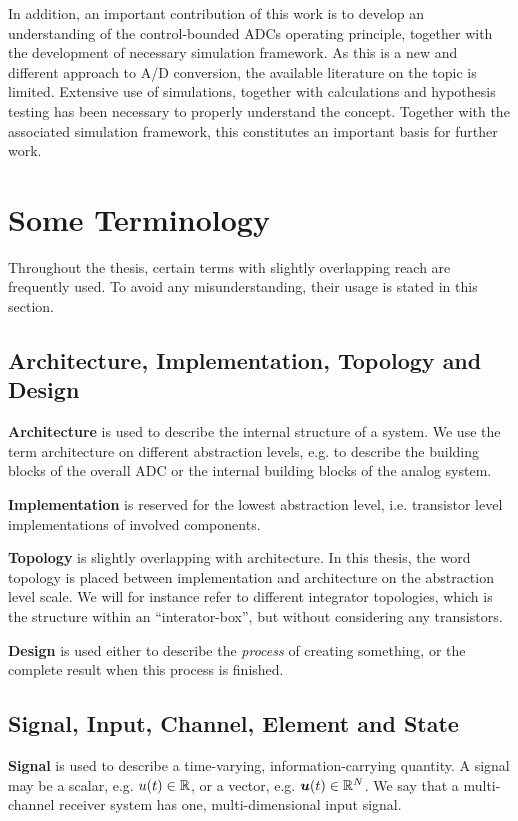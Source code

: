 In addition, an important contribution of this work is to develop an understanding of the control-bounded ADCs operating principle, together with the development of necessary simulation framework. As this is a new and different approach to A/D conversion, the available literature on the topic is limited. Extensive use of simulations, together with calculations and hypothesis testing has been necessary to properly understand the concept. Together with the associated simulation framework, this constitutes an important basis for further work.






\section{Some Terminology}
Throughout the thesis, certain terms with slightly overlapping reach are frequently used. To avoid any misunderstanding, their usage is stated in this section.

\subsection{Architecture, Implementation, Topology and Design}
\textbf{Architecture} is used to describe the internal structure of a system. We use the term architecture on different abstraction levels, e.g. to describe the building blocks of the overall ADC or the internal building blocks of the analog system.

\textbf{Implementation} is reserved for the lowest abstraction level, i.e. transistor level implementations of involved components.

\textbf{Topology} is slightly overlapping with architecture. In this thesis, the word topology is placed between implementation and architecture on the abstraction level scale. We will for instance refer to different integrator topologies, which is the structure within an \enquote{interator-box}, but without considering any transistors.

\textbf{Design} is used either to describe the \textit{process} of creating something, or the complete result when this process is finished.


\subsection{Signal, Input, Channel, Element and State}
\textbf{Signal} is used to describe a time-varying, information-carrying quantity. A signal may be a scalar, e.g. $u(t) \in \mathbb{R}$, or a vector, e.g. $\bm{u}(t) \in \mathbb{R}^N$. We say that a multi-channel receiver system has one, multi-dimensional input signal.

